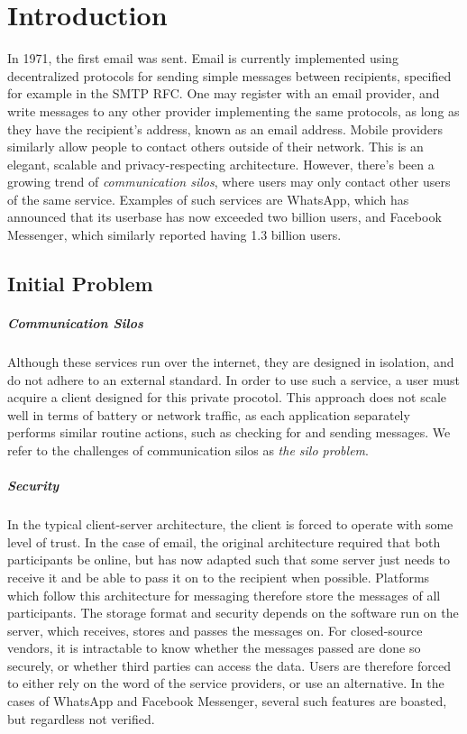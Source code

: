 \chapter{Introduction}
In 1971, the first email was sent\cite{tomlinson2009first}.
Email is currently implemented using decentralized protocols for sending simple messages between recipients, specified for example in the \ac{SMTP} \ac{RFC}\cite{RFC5321}.
One may register with an email provider, and write messages to any other provider implementing the same protocols, as long as they have the recipient's address, known as an email address.
Mobile providers similarly allow people to contact others outside of their network.
This is an elegant, scalable and privacy-respecting architecture.
However, there's been a growing trend of \textit{communication silos}, where users may only contact other users of the same service.
Examples of such services are WhatsApp, which has announced that its userbase has now exceeded two billion users\cite{whatsapp_2b_users_archive_org}, and Facebook Messenger, which similarly reported having 1.3 billion users\cite{messenger_1pt3b_users}.

\section{Initial Problem}\label{subsec:initial_problem_statement}
\paragraph{Communication Silos}
Although these services run over the internet, they are designed in isolation, and do not adhere to an external standard.
In order to use such a service, a user must acquire a client designed for this private procotol.
This approach does not scale well in terms of battery or network traffic, as each application separately performs similar routine actions, such as checking for and sending messages.
We refer to the challenges of communication silos as \textit{the silo problem}.

\paragraph{Security}
In the typical client-server architecture, the client is forced to operate with some level of trust.
In the case of email, the original architecture required that both participants be online, but has now adapted such that some server just needs to receive it and be able to pass it on to the recipient when possible\cite{tomlinson2009first}.
Platforms which follow this architecture for messaging therefore store the messages of all participants.
The storage format and security depends on the software run on the server, which receives, stores and passes the messages on.
For closed-source vendors, it is intractable to know whether the messages passed are done so securely, or whether third parties can access the data.
Users are therefore forced to either rely on the word of the service providers, or use an alternative.
In the cases of WhatsApp and Facebook Messenger, several such features are boasted, but regardless not verified\cite{twitter_comms_protocol_comparison}.

